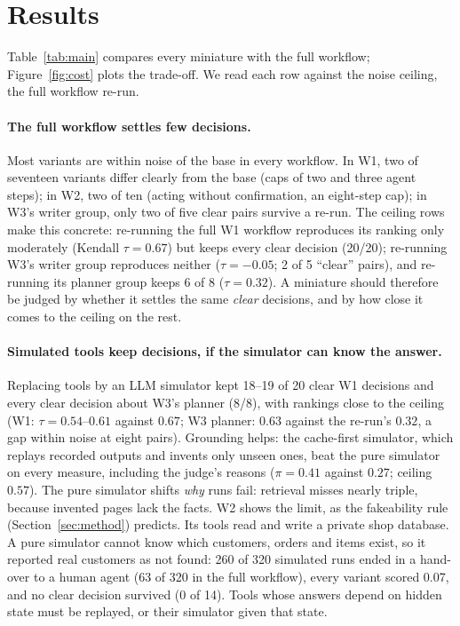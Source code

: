 \section{Results}
\label{sec:results}



Table~\ref{tab:main} compares every miniature with the full workflow; Figure~\ref{fig:cost}
plots the trade-off. We read each row against the noise ceiling, the full workflow re-run.

\paragraph{The full workflow settles few decisions.}
Most variants are within noise of the base in every workflow. In W1, two of seventeen variants
differ clearly from the base (caps of two and three agent steps); in W2, two of ten (acting without
confirmation, an eight-step cap); in W3's writer group, only two of five clear pairs survive a re-run. The ceiling rows
make this concrete: re-running the full W1 workflow reproduces its ranking only moderately
(Kendall $\tau=0.67$) but keeps every clear decision (20/20); re-running W3's writer group
reproduces neither ($\tau=-0.05$; 2 of 5 ``clear'' pairs), and re-running its planner group keeps
6 of 8 ($\tau=0.32$). A miniature should therefore be judged by
whether it settles the same \emph{clear} decisions, and by how close it comes to the ceiling on the
rest.

\paragraph{Simulated tools keep decisions, if the simulator can know the answer.}
Replacing tools by an LLM simulator kept 18--19 of 20 clear W1 decisions and every clear decision
about W3's planner (8/8), with rankings close to the ceiling (W1: $\tau=0.54$--$0.61$ against
$0.67$; W3 planner: $0.63$ against the re-run's $0.32$, a gap within noise at eight pairs). Grounding helps: the cache-first simulator, which replays recorded outputs and invents only
unseen ones, beat the pure simulator on every measure, including the judge's reasons ($\pi=0.41$
against $0.27$; ceiling $0.57$). The pure simulator shifts \emph{why} runs fail: retrieval misses
nearly triple, because invented pages lack the facts.
W2 shows the limit, as the fakeability rule (Section~\ref{sec:method}) predicts. Its tools read and
write a private shop database. A pure simulator cannot know which customers, orders and items
exist, so it reported real customers as not found: 260 of 320 simulated runs ended in a hand-over
to a human agent (63 of 320 in the full workflow), every variant scored 0.07, and no clear decision
survived (0 of 14). Tools whose answers depend on hidden state must be replayed, or their simulator
given that state.

